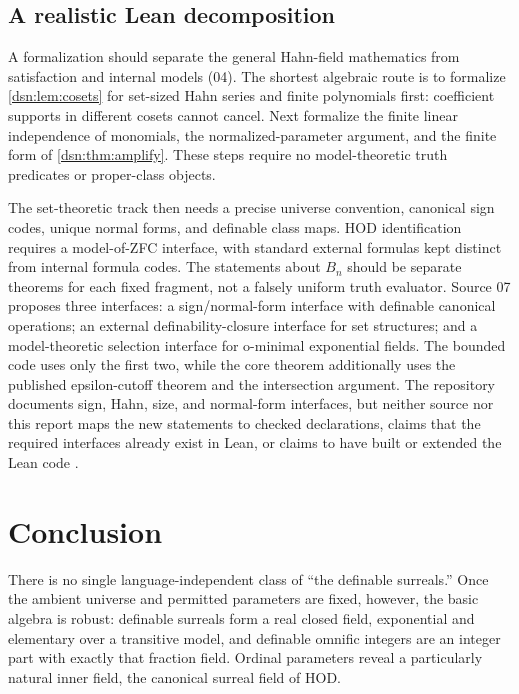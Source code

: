 \documentclass[11pt,a4paper]{article}
\numberwithin{equation}{section}
\theoremstyle{definition}
\theoremstyle{remark}
\newcommand{\HOD}{\mathrm{HOD}}
\begin{document}
\subsection{A realistic Lean decomposition}

A formalization should separate the general Hahn-field mathematics
from satisfaction and internal models (04). The shortest algebraic route
is to formalize \cref{dsn:lem:cosets} for set-sized Hahn series and
finite polynomials first: coefficient supports in different cosets
cannot cancel. Next formalize the finite linear independence of
monomials, the normalized-parameter argument, and the finite form
of \cref{dsn:thm:amplify}. These steps require no model-theoretic
truth predicates or proper-class objects.

The set-theoretic track then needs a precise universe convention,
canonical sign codes, unique normal forms, and definable class maps.
$\HOD$ identification requires a model-of-ZFC interface, with standard
external formulas kept distinct from internal formula codes.
The statements about $B_n$ should be separate theorems for each
fixed fragment, not a falsely uniform truth evaluator. Source 07 proposes
three interfaces: a sign/normal-form interface with definable canonical
operations; an external definability-closure interface for set structures;
and a model-theoretic selection interface for o-minimal exponential fields.
The bounded code uses only the first two, while the core theorem
additionally uses the published epsilon-cutoff theorem and the intersection
argument. The repository documents sign, Hahn, size, and normal-form
interfaces, but neither source nor this report maps the new statements to
checked declarations, claims that the required interfaces already exist in
Lean, or claims to have built or extended the Lean code \cite{Repo}.

\section{Conclusion}

There is no single language-independent class of ``the definable
surreals.'' Once the ambient universe and permitted parameters are
fixed, however, the basic algebra is robust: definable surreals form
a real closed field, exponential and elementary over a transitive model,
and definable omnific integers are an integer part with exactly that
fraction field. Ordinal parameters reveal a particularly natural inner
field, the canonical surreal field of $\HOD$.
\end{document}
